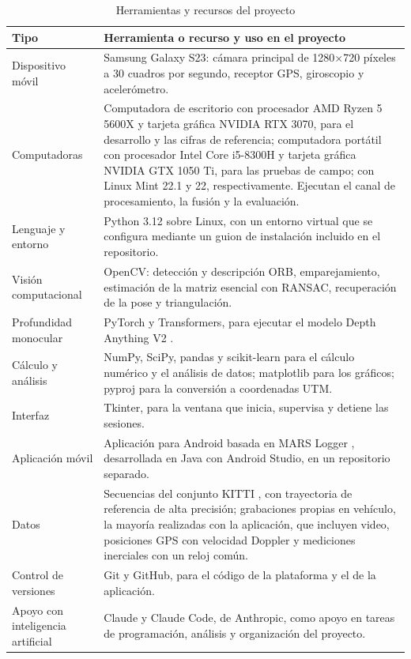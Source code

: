 \begin{table}[H]
\centering
\caption{Herramientas y recursos del proyecto}
\label{tab:met-herramientas}
\small
\begin{tabularx}{\textwidth}{@{}>{\raggedright\arraybackslash}p{3.0cm}>{\raggedright\arraybackslash}X@{}}
\toprule
\textbf{Tipo} & \textbf{Herramienta o recurso y uso en el proyecto} \\
\midrule
Dispositivo móvil & Samsung Galaxy S23: cámara principal de 1280$\times$720 píxeles a 30 cuadros por segundo, receptor GPS, giroscopio y acelerómetro. \\
\addlinespace
Computadoras & Computadora de escritorio con procesador AMD Ryzen 5 5600X y tarjeta gráfica NVIDIA RTX 3070, para el desarrollo y las cifras de referencia; computadora portátil con procesador Intel Core i5-8300H y tarjeta gráfica NVIDIA GTX 1050 Ti, para las pruebas de campo; con Linux Mint 22.1 y 22, respectivamente. Ejecutan el canal de procesamiento, la fusión y la evaluación. \\
\addlinespace
Lenguaje y entorno & Python 3.12 sobre Linux, con un entorno virtual que se configura mediante un guion de instalación incluido en el repositorio. \\
\addlinespace
Visión computacional & OpenCV: detección y descripción ORB, emparejamiento, estimación de la matriz esencial con RANSAC, recuperación de la pose y triangulación. \\
\addlinespace
Profundidad monocular & PyTorch y Transformers, para ejecutar el modelo Depth Anything V2 \cite{yang2024depthanything}. \\
\addlinespace
Cálculo y análisis & NumPy, SciPy, pandas y scikit-learn para el cálculo numérico y el análisis de datos; matplotlib para los gráficos; pyproj para la conversión a coordenadas UTM. \\
\addlinespace
Interfaz & Tkinter, para la ventana que inicia, supervisa y detiene las sesiones. \\
\addlinespace
Aplicación móvil & Aplicación para Android basada en MARS Logger \cite{huai2019mars}, desarrollada en Java con Android Studio, en un repositorio separado. \\
\addlinespace
Datos & Secuencias del conjunto KITTI \cite{geiger2012kitti}, con trayectoria de referencia de alta precisión; grabaciones propias en vehículo, la mayoría realizadas con la aplicación, que incluyen video, posiciones GPS con velocidad Doppler y mediciones inerciales con un reloj común. \\
\addlinespace
Control de versiones & Git y GitHub, para el código de la plataforma y el de la aplicación. \\
\addlinespace
Apoyo con inteligencia artificial & Claude y Claude Code, de Anthropic, como apoyo en tareas de programación, análisis y organización del proyecto. \\
\bottomrule
\end{tabularx}
\end{table}

